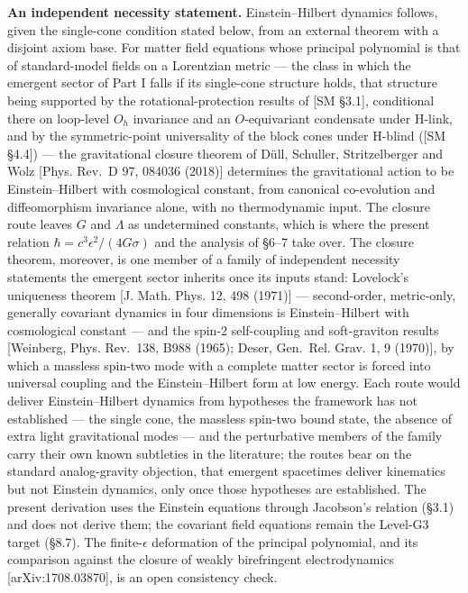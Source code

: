 \documentclass[
]{article}
\begin{document}
\textbf{An independent necessity statement.} Einstein--Hilbert dynamics
follows, given the single-cone condition stated below, from an external
theorem with a disjoint axiom base. For matter field equations whose
principal polynomial is that of standard-model fields on a Lorentzian
metric --- the class in which the emergent sector of Part I falls if its
single-cone structure holds, that structure being supported by the
rotational-protection results of {[}SM §3.1{]}, conditional there on
loop-level \(O_h\) invariance and an \(O\)-equivariant condensate under
H-link, and by the symmetric-point universality of the block cones under
H-blind ({[}SM §4.4{]}) --- the gravitational closure theorem of Düll,
Schuller, Stritzelberger and Wolz {[}Phys. Rev.~D 97, 084036 (2018){]}
determines the gravitational action to be Einstein--Hilbert with
cosmological constant, from canonical co-evolution and diffeomorphism
invariance alone, with no thermodynamic input. The closure route leaves
\(G\) and \(\Lambda\) as undetermined constants, which is where the
present relation \(\hbar = c^3\epsilon^2/(4G\sigma)\) and the analysis
of §6--7 take over. The closure theorem, moreover, is one member of a
family of independent necessity statements the emergent sector inherits
once its inputs stand: Lovelock's uniqueness theorem {[}J. Math. Phys.
12, 498 (1971){]} --- second-order, metric-only, generally covariant
dynamics in four dimensions is Einstein--Hilbert with cosmological
constant --- and the spin-2 self-coupling and soft-graviton results
{[}Weinberg, Phys. Rev.~138, B988 (1965); Deser, Gen.~Rel. Grav. 1, 9
(1970){]}, by which a massless spin-two mode with a complete matter
sector is forced into universal coupling and the Einstein--Hilbert form
at low energy. Each route would deliver Einstein--Hilbert dynamics from
hypotheses the framework has not established --- the single cone, the
massless spin-two bound state, the absence of extra light gravitational
modes --- and the perturbative members of the family carry their own
known subtleties in the literature; the routes bear on the standard
analog-gravity objection, that emergent spacetimes deliver kinematics
but not Einstein dynamics, only once those hypotheses are established.
The present derivation uses the Einstein equations through Jacobson's
relation (§3.1) and does not derive them; the covariant field equations
remain the Level-G3 target (§8.7). The finite-\(\epsilon\) deformation
of the principal polynomial, and its comparison against the closure of
weakly birefringent electrodynamics {[}arXiv:1708.03870{]}, is an open
consistency check.
\end{document}
